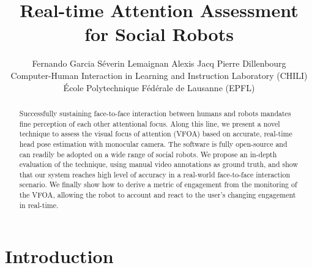\documentclass{sig-alternate}
\begin{document}
%

\title{Real-time Attention Assessment for Social Robots}
\author{Fernando Garcia \qquad Séverin Lemaignan \qquad Alexis Jacq \qquad Pierre Dillenbourg\\Computer-Human Interaction in Learning and Instruction Laboratory (CHILI)\\École Polytechnique Fédérale de Lausanne (EPFL)}


\maketitle
\begin{abstract}

Successfully sustaining face-to-face interaction between humans and robots
mandates fine perception of each other attentional focus. Along this line, we
present a novel technique to assess the visual focus of attention (VFOA) based
on accurate, real-time head pose estimation with monocular camera. The software
is fully open-source and can readily be adopted on a wide range of social
robots. We propose an in-depth evaluation of the technique, using manual video
annotations as ground truth, and show that our system reaches high level of
accuracy in a real-world face-to-face interaction scenario. We finally show how
to derive a metric of engagement from the monitoring of the VFOA, allowing the
robot to account and react to the user's changing engagement in real-time.

\end{abstract}




\section{Introduction}
\end{document}
